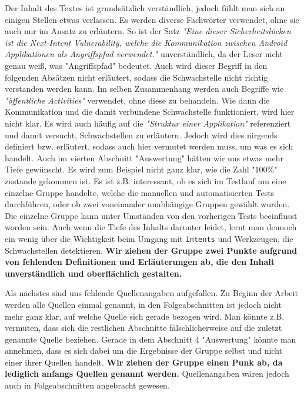 \documentclass{article}
\begin{document}
  Der Inhalt des Textes ist grundsätzlich verständlich, jedoch fühlt man sich an
  einigen Stellen etwas verlassen. Es werden diverse Fachwörter verwendet, ohne
  sie auch nur im Ansatz zu erläutern. So ist der Satz \textit{"Eine dieser
  Sicherheitslücken ist die Next-Intent Vulnerability, welche die Kommunikation
  zwischen Android Applikationen als Angriffspfad verwendet."} unverständlich,
  da der Leser nicht genau weiß, was "Angriffspfad" bedeutet. Auch wird dieser
  Begriff in den folgenden Absätzen nicht erläutert, sodass die Schwachstelle
  nicht richtig verstanden werden kann. Im selben Zusammenhang werden auch
  Begriffe wie \textit{"öffentliche Activities"} verwendet, ohne diese zu
  behandeln. Wie dann die Kommunikation und die damit verbundene Schwachstelle
  funktioniert, wird hier nicht klar. Es wird auch häufig auf die
  \textit{"Struktur einer Applikation"} referenziert und damit versucht,
  Schwachstellen zu erläutern. Jedoch wird dies nirgends definiert bzw.
  erläutert, sodass auch hier vermutet werden muss, um was es sich handelt.
  Auch im vierten Abschnitt "Auswertung" hätten wir uns etwas mehr Tiefe
  gewünscht. Es wird zum Beispiel nicht ganz klar, wie die Zahl "100\%" zustande
  gekommen ist. Es ist z.B. interessant, ob es sich im Testlauf um eine einzelne
  Gruppe handelte, welche die manuellen und automatisierten Tests durchführen,
  oder ob zwei voneinander unabhängige Gruppen gewählt wurden. Die einzelne
  Gruppe kann unter Umständen von den vorherigen Tests beeinflusst worden sein.
  Auch wenn die Tiefe des Inhalts darunter leidet, lernt man dennoch ein wenig
  über die Wichtigkeit beim Umgang mit \texttt{Intents} und Werkzeugen, die
  Schwachstellen detektieren.  \textbf{Wir ziehen der Gruppe zwei Punkte
  aufgrund von fehlenden Definitionen und Erläuterungen ab, die den Inhalt
  unverständlich und oberflächlich gestalten.}

  Als nächstes sind uns fehlende Quellenangaben aufgefallen. Zu Beginn der
  Arbeit werden alle Quellen einmal genannt, in den Folgeabschnitten ist jedoch
  nicht mehr ganz klar, auf welche Quelle sich gerade bezogen wird. Man könnte
  z.B. vermuten, dass sich die restlichen Abschnitte fälschlicherweise auf die
  zuletzt genannte Quelle beziehen. Gerade in dem Abschnitt 4 "Auswertung"
  könnte man annehmen, dass es sich dabei um die Ergebnisse der Gruppe selbst
  und nicht einer ihrer Quellen handelt. \textbf{Wir ziehen der Gruppe einen
  Punk ab, da lediglich anfangs Quellen genannt werden.} Quellenangaben wären
  jedoch auch in Folgeabschnitten angebracht gewesen.
\end{document}
